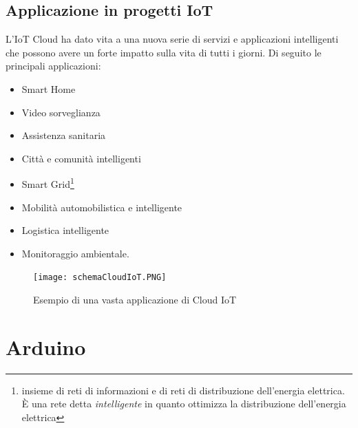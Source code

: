 \documentclass[a4paper,titlepage]{report}
\begin{document}
\section{Applicazione in progetti IoT}
L'IoT Cloud ha dato vita a una nuova serie di servizi e applicazioni intelligenti che possono avere un forte impatto sulla vita di tutti i giorni. Di seguito le principali applicazioni:
\begin{itemize}
\item Smart Home
\item Video sorveglianza
\item Assistenza sanitaria
\item Città e comunità intelligenti
\item Smart Grid\footnote{insieme di reti di informazioni e di reti di distribuzione dell’energia elettrica. È una rete detta {\itshape intelligente} in quanto ottimizza la distribuzione dell’energia elettrica}
\item Mobilità automobilistica e intelligente
\item Logistica intelligente
\item Monitoraggio ambientale\cite{Botta:IntegrationofCloudcomputingandInternetofThingsAsurvey}.
\end{itemize}
\begin{figure}[h]
\centering
\texttt{[image: schemaCloudIoT.PNG]}
\caption{Esempio di una vasta applicazione di Cloud IoT}
\end{figure}

\chapter{Arduino}
\end{document}
